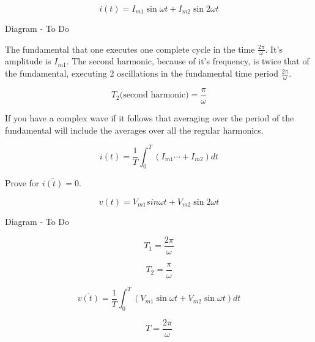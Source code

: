 \documentclass[a4paper,12pt]{article}
\begin{document}
\[ i(t) = I_{m1} \sin{\omega t} + I_{m2} \sin{2 \omega t} \]

\begin{table}[hbtp]

Diagram - To Do

\end{table}

The fundamental that one executes one complete cycle in the
time $\frac{2 \pi}{\omega}$. It's amplitude is $I_{m1}$. The second
harmonic, because of it's frequency, is twice that of the fundamental,
executing $2$ oscillations in the fundamental time period $\frac{2
\pi}{\omega}$.

\[ T_{2} \mbox{(second harmonic)} = \frac{\pi}{\omega} \]

If you have a complex wave if it follows that averaging over
the period of the fundamental will include the averages over all the
regular harmonics.

\[ i(t) = \frac{1}{T} \int^{T}_{0} (I_{m1} \cdots + I_{m2}) dt \]

Prove for $\overline{i(t)} = 0$.


\[ v(t) = V_{m1} sin{\omega t} + V_{m2} \sin{2 \omega t} \]

\begin{table}[hbtp]

Diagram - To Do

\end{table}

\[ T_{1} = \frac{2 \pi}{\omega} \]

\[ T_{2} = \frac{\pi}{\omega} \]

\[ \overline{v(t)} = \frac{1}{T} \int^{T}_{0} \left(V_{m1} \sin{\omega
t} + V_{m2} \sin{\omega t} \right) dt \]

\[ T = \frac{2 \pi}{\omega} \]
\end{document}
